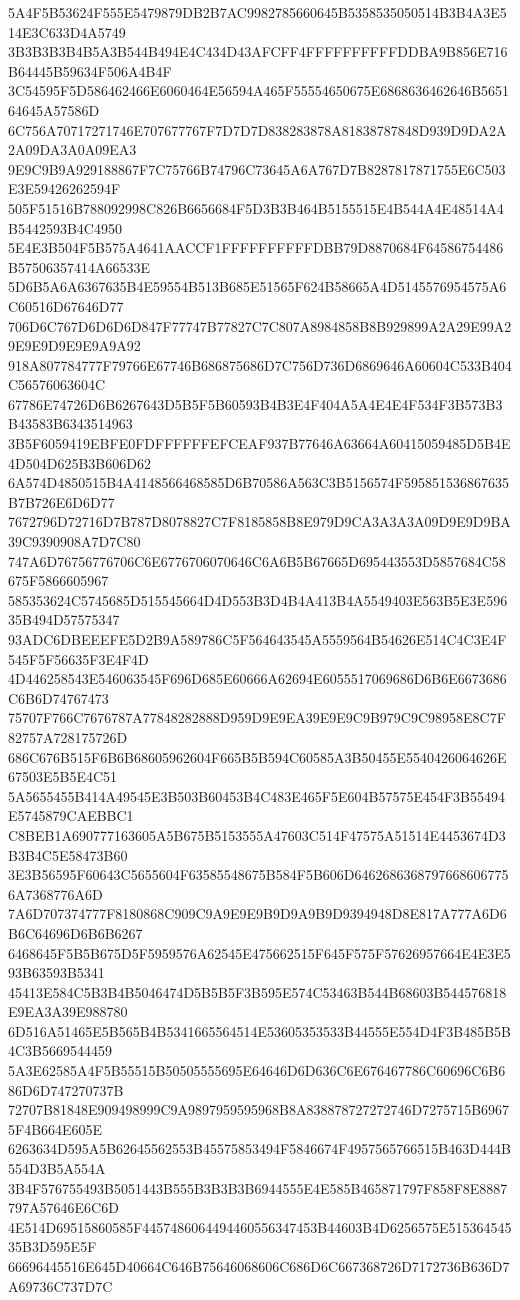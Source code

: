 {{{{{{{{{{{{{{{{{{{{{5A4F5B53624F555E5479879DB2B7AC9982785660645B5358535050514B3B4A3E514E3C633D4A5749
3B3B3B3B4B5A3B544B494E4C434D43AFCFF4FFFFFFFFFFDDBA9B856E716B64445B59634F506A4B4F
3C54595F5D586462466E6060464E56594A465F55554650675E6868636462646B565164645A57586D
6C756A70717271746E707677767F7D7D7D838283878A81838787848D939D9DA2A2A09DA3A0A09EA3
9E9C9B9A929188867F7C75766B74796C73645A6A767D7B8287817871755E6C503E3E59426262594F
505F51516B788092998C826B6656684F5D3B3B464B5155515E4B544A4E48514A4B5442593B4C4950
5E4E3B504F5B575A4641AACCF1FFFFFFFFFFDBB79D8870684F64586754486B57506357414A66533E
5D6B5A6A6367635B4E59554B513B685E51565F624B58665A4D5145576954575A6C60516D67646D77
706D6C767D6D6D6D847F77747B77827C7C807A8984858B8B929899A2A29E99A29E9E9D9E9E9A9A92
918A807784777F79766E67746B686875686D7C756D736D6869646A60604C533B404C56576063604C
67786E74726D6B6267643D5B5F5B60593B4B3E4F404A5A4E4E4F534F3B573B3B43583B6343514963
3B5F6059419EBFE0FDFFFFFFEFCEAF937B77646A63664A60415059485D5B4E4D504D625B3B606D62
6A574D4850515B4A4148566468585D6B70586A563C3B5156574F595851536867635B7B726E6D6D77
7672796D72716D7B787D8078827C7F8185858B8E979D9CA3A3A3A09D9E9D9BA39C9390908A7D7C80
747A6D76756776706C6E6776706070646C6A6B5B67665D695443553D5857684C58675F5866605967
585353624C5745685D515545664D4D553B3D4B4A413B4A5549403E563B5E3E59635B494D57575347
93ADC6DBEEEFE5D2B9A589786C5F564643545A5559564B54626E514C4C3E4F545F5F56635F3E4F4D
4D446258543E546063545F696D685E60666A62694E6055517069686D6B6E6673686C6B6D74767473
75707F766C7676787A77848282888D959D9E9EA39E9E9C9B979C9C98958E8C7F82757A728175726D
686C676B515F6B6B68605962604F665B5B594C60585A3B50455E5540426064626E67503E5B5E4C51
5A5655455B414A49545E3B503B60453B4C483E465F5E604B57575E454F3B55494E5745879CAEBBC1
C8BEB1A690777163605A5B675B5153555A47603C514F47575A51514E4453674D3B3B4C5E58473B60
3E3B56595F60643C5655604F63585548675B584F5B606D64626863687976686067756A7368776A6D
7A6D707374777F8180868C909C9A9E9E9B9D9A9B9D9394948D8E817A777A6D6B6C64696D6B6B6267
6468645F5B5B675D5F5959576A62545E475662515F645F575F57626957664E4E3E593B63593B5341
45413E584C5B3B4B5046474D5B5B5F3B595E574C53463B544B68603B544576818E9EA3A39E988780
6D516A51465E5B565B4B5341665564514E53605353533B44555E554D4F3B485B5B4C3B5669544459
5A3E62585A4F5B55515B50505555695E64646D6D636C6E676467786C60696C6B686D6D747270737B
72707B81848E909498999C9A9897959595968B8A838878727272746D7275715B69675F4B664E605E
6263634D595A5B62645562553B45575853494F5846674F4957565766515B463D444B554D3B5A554A
3B4F576755493B5051443B555B3B3B3B6944555E4E585B465871797F858F8E8887797A57646E6C6D
4E514D69515860585F4457486064494460556347453B44603B4D6256575E51536454535B3D595E5F
66696445516E645D40664C646B75646068606C686D6C667368726D7172736B636D7A69736C737D7C
}}}}}}}}}}}}}}}}}}}}}
